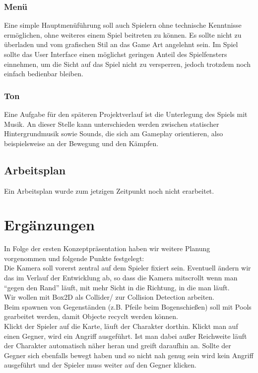 \documentclass[10pt,a4paper,notitlepage]{report}
\begin{document}
\begin{flushleft}
\subsection{Menü}
Eine simple Hauptmenüführung soll auch Spielern ohne technische Kenntnisse ermöglichen, ohne weiteres einem Spiel beitreten zu können. Es sollte nicht zu überladen und vom grafischen Stil an das Game Art angelehnt sein. Im Spiel sollte das User Interface einen möglichst geringen Anteil des Spielfensters einnehmen, um die Sicht auf das Spiel nicht zu versperren, jedoch trotzdem noch einfach bedienbar bleiben. 

\subsection{Ton} 
Eine Aufgabe für den späteren Projektverlauf ist die Unterlegung des Spiels mit Musik. An dieser Stelle kann unterschieden werden zwischen statischer Hintergrundmusik sowie Sounds, die sich am Gameplay orientieren, also beispielsweise an der Bewegung und den Kämpfen.

\section{Arbeitsplan}
Ein Arbeitsplan wurde zum jetzigen Zeitpunkt noch nicht erarbeitet.

\chapter{Ergänzungen}
In Folge der ersten Konzeptpräsentation haben wir weitere Planung vorgenommen und folgende Punkte festgelegt:\\
Die Kamera soll vorerst zentral auf dem Spieler fixiert sein. Eventuell ändern wir das im Verlauf der Entwicklung ab, so dass die Kamera mitscrollt wenn man \enquote{gegen den Rand} läuft, mit mehr Sicht in die Richtung, in die man läuft.\\
Wir wollen mit Box2D als Collider/ zur Collision Detection arbeiten.\\
Beim spawnen von Gegenständen (z.B. Pfeile beim Bogenschießen) soll mit Pools gearbeitet werden, damit Objecte recyclt werden können.\\
Klickt der Spieler auf die Karte, läuft der Charakter dorthin. Klickt man auf einen Gegner, wird ein Angriff ausgeführt. Ist man dabei außer Reichweite läuft der Charakter automatisch näher heran und greift daraufhin an. Sollte der Gegner sich ebenfalls bewegt haben und so nicht nah genug sein wird kein Angriff ausgeführt und der Spieler muss weiter auf den Gegner klicken.\\


\end{flushleft}
\end{document}
